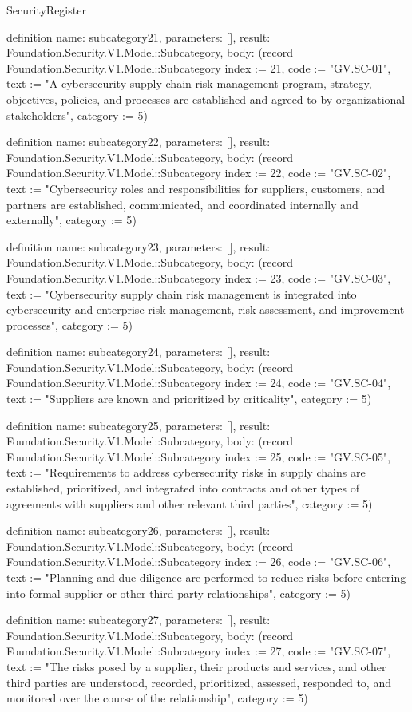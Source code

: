 \begin{lexlean}{SecurityRegister}
\begin{semanticmodule}
definition{
  name: subcategory21,
  parameters: [],
  result: Foundation.Security.V1.Model::Subcategory,
  body: (record Foundation.Security.V1.Model::Subcategory {index := 21, code := "GV.SC-01", text := "A cybersecurity supply chain risk management program, strategy, objectives, policies, and processes are established and agreed to by organizational stakeholders", category := 5})
}

definition{
  name: subcategory22,
  parameters: [],
  result: Foundation.Security.V1.Model::Subcategory,
  body: (record Foundation.Security.V1.Model::Subcategory {index := 22, code := "GV.SC-02", text := "Cybersecurity roles and responsibilities for suppliers, customers, and partners are established, communicated, and coordinated internally and externally", category := 5})
}

definition{
  name: subcategory23,
  parameters: [],
  result: Foundation.Security.V1.Model::Subcategory,
  body: (record Foundation.Security.V1.Model::Subcategory {index := 23, code := "GV.SC-03", text := "Cybersecurity supply chain risk management is integrated into cybersecurity and enterprise risk management, risk assessment, and improvement processes", category := 5})
}

definition{
  name: subcategory24,
  parameters: [],
  result: Foundation.Security.V1.Model::Subcategory,
  body: (record Foundation.Security.V1.Model::Subcategory {index := 24, code := "GV.SC-04", text := "Suppliers are known and prioritized by criticality", category := 5})
}

definition{
  name: subcategory25,
  parameters: [],
  result: Foundation.Security.V1.Model::Subcategory,
  body: (record Foundation.Security.V1.Model::Subcategory {index := 25, code := "GV.SC-05", text := "Requirements to address cybersecurity risks in supply chains are established, prioritized, and integrated into contracts and other types of agreements with suppliers and other relevant third parties", category := 5})
}

definition{
  name: subcategory26,
  parameters: [],
  result: Foundation.Security.V1.Model::Subcategory,
  body: (record Foundation.Security.V1.Model::Subcategory {index := 26, code := "GV.SC-06", text := "Planning and due diligence are performed to reduce risks before entering into formal supplier or other third-party relationships", category := 5})
}

definition{
  name: subcategory27,
  parameters: [],
  result: Foundation.Security.V1.Model::Subcategory,
  body: (record Foundation.Security.V1.Model::Subcategory {index := 27, code := "GV.SC-07", text := "The risks posed by a supplier, their products and services, and other third parties are understood, recorded, prioritized, assessed, responded to, and monitored over the course of the relationship", category := 5})
}


\end{semanticmodule}
\end{lexlean}
